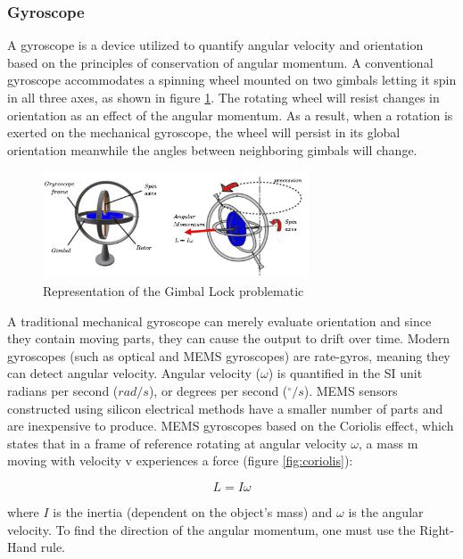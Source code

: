 \subsubsection{Gyroscope}
A gyroscope is a device utilized to quantify angular velocity and orientation based on the principles of conservation of angular momentum. A conventional gyroscope accommodates a spinning wheel mounted on two gimbals letting it spin in all three axes, as shown in figure \ref{fig:gyroscope}. The rotating wheel will resist changes in orientation as an effect of the angular momentum. As a result, when a rotation is exerted on the mechanical gyroscope, the wheel will persist in its global orientation meanwhile the angles between neighboring gimbals will change.

\begin{figure}[!h]
    \centering
    \includegraphics[width=0.7\textwidth]{figures/gyroscope.pdf}
    \caption{Representation of the Gimbal Lock problematic \cite{zeitlhofler2019nominal}  }
    \label{fig:gyroscope}
\end{figure}

A traditional mechanical gyroscope can merely evaluate orientation and since they contain moving parts, they can cause the output to drift over time. Modern gyroscopes (such as optical and MEMS gyroscopes) are rate-gyros, meaning they can detect angular velocity. Angular velocity ($\omega$) is quantified in the SI unit radians per second ($rad/s$), or degrees per second ($^{\circ}/s$). MEMS  sensors constructed using silicon electrical methods have a smaller number of parts and are inexpensive to produce. MEMS gyroscopes based on the Coriolis effect, which states that in a frame of reference rotating at angular velocity $\omega$, a mass m moving with velocity v experiences a force (figure \ref{fig:coriolis}):

\begin{equation}
    L = I\omega
\end{equation}

where $I$ is the inertia (dependent on the object’s mass) and $\omega$ is the angular velocity. To find the direction of the angular momentum, one must use the Right-Hand rule.

